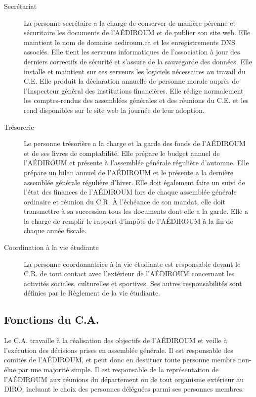 \documentclass{aediroum}
\begin{document}
\begin{description}
\item[Secrétariat] La personne secrétaire a la charge de conserver de manière pérenne et sécuritaire les
documents de l’AÉDIROUM et de publier son site web. Elle maintient le nom de domaine
aediroum.ca et les enregistrements DNS associés. Elle tient les serveurs informatiques
de l’association à jour des derniers correctifs de sécurité et s’assure de la sauvegarde des
données. Elle installe et maintient sur ces serveurs les logiciels nécessaires au travail
du C.E. Elle produit la déclaration annuelle de personne morale auprès de l’Inspecteur
général des institutions financières. Elle rédige normalement les comptes-rendus des assemblées
générales et des réunions du C.E. et les rend disponibles sur le site web la journée
de leur adoption.
\item[Trésorerie] Le personne trésorière a la charge et la garde des fonds de l'AÉDIROUM et de ses livres de comptabilité. Elle prépare le budget annuel de l'AÉDIROUM et présente à l'assemblée générale régulière d'automne. Elle prépare un bilan annuel de l'AÉDIROUM et le présente a la dernière assemblée générale régulière d'hiver. Elle doit également faire un suivi de l'état des finances de l'AÉDIROUM lors de chaque assemblée générale ordinaire et réunion du C.R. À l'échéance de son mandat, elle doit transmettre à sa succession tous les documents dont elle a la garde. Elle a la charge de remplir le rapport d'impôts de l'AÉDIROUM à la fin de chaque année fiscale.
\item[Coordination à la vie étudiante] La personne coordonnatrice à la vie étudiante est responsable devant le C.R. de tout contact avec l'extérieur de l'AÉDIROUM concernant les activités sociales, culturelles et sportives. Ses autres responsabilités sont définies par le Règlement de la vie étudiante.
\end{description}

\subsection{Fonctions du C.A.}\label{sec:fonctions-du-conseil-executif}

Le C.A. travaille à la réalisation des objectifs de l'AÉDIROUM et veille à l'exécution des décisions prises en assemblée générale. Il est responsable des comités de l'AÉDIROUM, et peut donc en destituer toute personne membre non-élue par une majorité simple. Il est responsable de la représentation de l'AÉDIROUM aux réunions du département ou de tout organisme extérieur au DIRO, incluant le choix des personnes déléguées parmi ses personnes membres.
\end{document}
